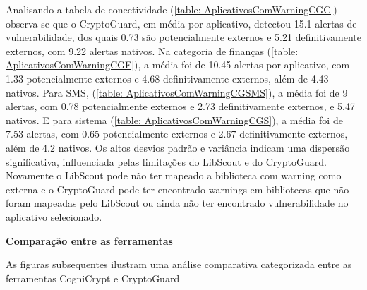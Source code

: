 Analisando a tabela de conectividade (\ref{table: AplicativosComWarningCGC})  observa-se que o CryptoGuard, em média por aplicativo, detectou 15.1 alertas de vulnerabilidade, dos quais 0.73 são potencialmente externos e 5.21 definitivamente externos, com 9.22 alertas nativos. 
Na categoria de finanças (\ref{table: AplicativosComWarningCGF}), a média foi de 10.45 alertas por aplicativo, com 1.33 potencialmente externos e 4.68 definitivamente externos, além de 4.43 nativos.
Para SMS, (\ref{table: AplicativosComWarningCGSMS}), a média foi de 9 alertas, com 0.78 potencialmente externos e 2.73 definitivamente externos, e 5.47 nativos.
E para sistema (\ref{table: AplicativosComWarningCGS}), a média foi de 7.53 alertas, com 0.65 potencialmente externos e 2.67 definitivamente externos, além de 4.2 nativos. 
Os altos desvios padrão e variância indicam uma dispersão significativa, influenciada pelas limitações do LibScout e do CryptoGuard. \cite{perception_developers} Novamente o LibScout pode não ter mapeado a biblioteca com warning como externa \cite{LibScout} e o CryptoGuard pode ter encontrado warnings em bibliotecas que não foram mapeadas pelo LibScout ou ainda não ter encontrado vulnerabilidade no aplicativo selecionado. \cite{perception_developers}

\newline
\textbf {Comparação entre as ferramentas}
\newline

As figuras subsequentes ilustram uma análise comparativa categorizada entre as ferramentas CogniCrypt e CryptoGuard


